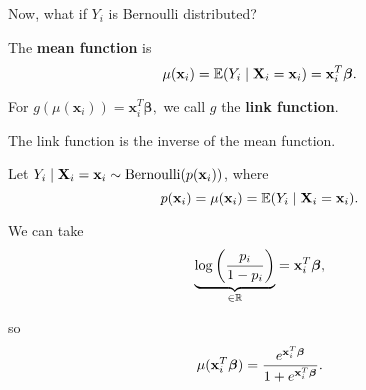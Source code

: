 Now, what if $Y_i$ is Bernoulli distributed? 

\begin{definition}
	The \textbf{mean function} is \[
	\mu(\mathbf x_i)=\mathbb E(Y_i\mid \mathbf X_i=\mathbf x_i)=\mathbf x_i^T\boldsymbol \beta
	.\] 			
\end{definition}

\begin{definition}
	For $g(\mu(\mathbf x_i))=\mathbf x_i^T\boldsymbol\beta,$ we call $g$ the \textbf{link function}.
\end{definition}

\begin{note}
	The link function is the inverse of the mean function.
\end{note}

\begin{eg}	
	Let $Y_i\mid \mathbf X_i=\mathbf x_i\sim \operatorname*{Bernoulli}(p(\mathbf x_i))$, where  \[
	p(\mathbf x_i)=\mu(\mathbf x_i)=\mathbb E(Y_i\mid \mathbf X_i=\mathbf x_i)
	.\] 
\end{eg}

We can take\[
		\underbrace{\log\left( \frac{p_i}{1-p_i}\right)}_{\in \mathbb R}=\mathbf x_i^T\boldsymbol \beta,
\] 

so $$\mu(\mathbf x_i^T{\boldsymbol{\beta}})=\frac{e^{\mathbf x_i^T{\boldsymbol{\beta}}}}{1+e^{\mathbf x_i^T{\boldsymbol{\beta}}}}.$$

